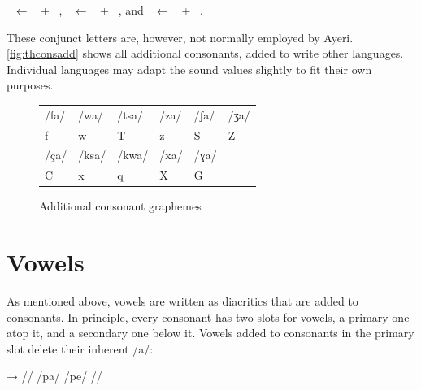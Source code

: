 \pex
	\a {}~ ← ~ + 
		~,
	\a {}~ ← ~ + 
		~, and 
	\a {}~ ← ~ + 
		~.
\xe

\noindent These conjunct letters are, however, not normally employed by Ayeri.
\autoref{fig:thconsadd} shows all additional consonants, added to write other
languages. Individual languages may adapt the sound values slightly to fit
their own purposes.

\begin{figure}[t]
\caption{Additional consonant graphemes}

\begin{tabu} to \linewidth{X[c] X[c] X[c] X[c] X[c] X[c]}
\toprule
\tableheaderfont	/fa/ & /wa/ & /tsa/ & /za/ & /ʃa/ & /ʒa/ \\
\rowfont{\Tagati\huge}	f & w & T & z & S & Z \\

\midrule

\tableheaderfont	/ça/ & /ksa/ & /kwa/ & /xa/ & /ɣa/ \\
\rowfont{\Tagati\huge}	C & x & q & X & G \\

\bottomrule
\end{tabu}
\label{fig:thconsadd}
\end{figure}


\section{Vowels}

As mentioned above, vowels are written as diacritics that are added to 
consonants. In principle, every consonant has two slots for vowels, a primary 
one atop it, and a secondary one below it. Vowels added to consonants in 
the primary slot delete their inherent /a/:

\ex[lingstyle=thex]\begingl
	\gla {}	→	 //
	\glb /pa/	{}	/pe/ //
\endgl\xe

